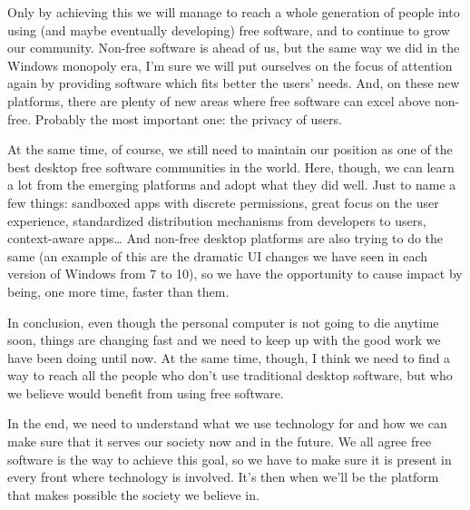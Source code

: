 Only by achieving this we will manage to reach a whole generation of people into using (and maybe eventually developing) free software, and to continue to grow our community. Non-free software is ahead of us, but the same way we did in the Windows monopoly era, I’m sure we will put ourselves on the focus of attention again by providing software which fits better the users’ needs. And, on these new platforms, there are plenty of new areas where free software can excel above non-free. Probably the most important one: the privacy of users.

At the same time, of course, we still need to maintain our position as one of the best desktop free software communities in the world. Here, though, we can learn a lot from the emerging platforms and adopt what they did well. Just to name a few things: sandboxed apps with discrete permissions, great focus on the user experience, standardized distribution mechanisms from developers to users, context-aware apps… And non-free desktop platforms are also trying to do the same (an example of this are the dramatic UI changes we have seen in each version of Windows from 7 to 10), so we have the opportunity to cause impact by being, one more time, faster than them.

In conclusion, even though the personal computer is not going to die anytime soon, things are changing fast and we need to keep up with the good work we have been doing until now. At the same time, though, I think we need to find a way to reach all the people who don't use traditional desktop software, but who we believe would benefit from using free software.

In the end, we need to understand what we use technology for and how we can make sure that it serves our society now and in the future. We all agree free software is the way to achieve this goal, so we have to make sure it is present in every front where technology is involved. It’s then when we’ll be the platform that makes possible the society we believe in.